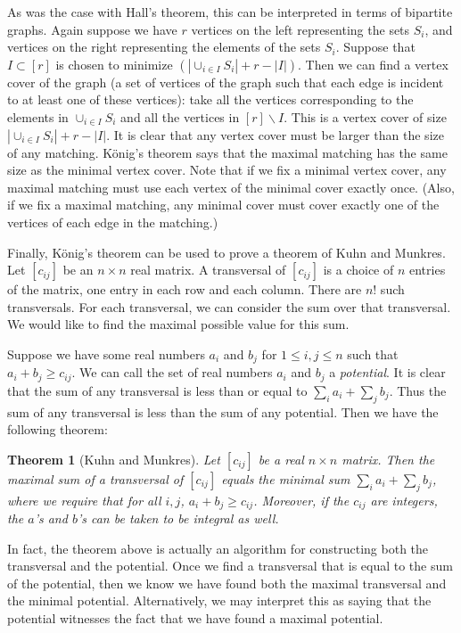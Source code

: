 \documentclass[10pt]{amsart}
\newtheorem{theorem}{Theorem}[section]
\theoremstyle{definition}
\begin{document}
As was the case with Hall's theorem, this can be interpreted in terms of bipartite graphs. Again suppose we have $r$ vertices on the left representing the sets $S_i$, and vertices on the right representing the elements of the sets $S_i$. Suppose that $I \subset [r]$ is chosen to minimize $\left( \left| \cup_{i\in I} S_i \right| + r - |I| \right).$ Then we can find a vertex cover of the graph (a set of vertices of the graph such that each edge is incident to at least one of these vertices): take all the vertices corresponding to the elements in $\cup_{i\in I} S_i$ and all the vertices in $[r] \backslash I$. This is a vertex cover of size $\left| \cup_{i\in I} S_i \right| + r - |I|$. It is clear that any vertex cover must be larger than the size of any matching. K{\"o}nig's theorem says that the maximal matching has the same size as the minimal vertex cover. Note that if we fix a minimal vertex cover, any maximal matching must use each vertex of the minimal cover exactly once. (Also, if we fix a maximal matching, any minimal cover must cover exactly one of the vertices of each edge in the matching.)

Finally, K{\"o}nig's theorem can be used to prove a theorem of Kuhn and Munkres. Let $[c_{ij}]$ be an $n \times n$ real matrix. A transversal of $[c_{ij}]$ is a choice of $n$ entries of the matrix, one entry in each row and each column. There are $n!$ such transversals. For each transversal, we can consider the sum over that transversal. We would like to find the maximal possible value for this sum.

Suppose we have some real numbers $a_i$ and $b_j$ for $1 \leq i,j \leq n$ such that $a_i + b_j \geq c_{ij}$. We can call the set of real numbers $a_i$ and $b_j$ a \emph{potential}. It is clear that the sum of any transversal is less than or equal to $\sum_i a_i + \sum_j b_j$. Thus the sum of any transversal is less than the sum of any potential. Then we have the following theorem:

\begin{theorem}[Kuhn and Munkres] \label{comb3}
Let $[c_{ij}]$ be a real $n\times n$ matrix. Then the maximal sum of a transversal of $[c_{ij}]$ equals the minimal sum $\sum_i a_i + \sum_j b_j$, where we require that for all $i, j$, $a_i + b_j \geq c_{ij}$. Moreover, if the $c_{ij}$ are integers, the $a$'s and $b$'s can be taken to be integral as well.
\end{theorem}

In fact, the theorem above is actually an algorithm for constructing both the transversal and the potential. Once we find a transversal that is equal to the sum of the potential, then we know we have found both the maximal transversal and the minimal potential. Alternatively, we may interpret this as saying that the potential witnesses the fact that we have found a maximal potential.
\end{document}
